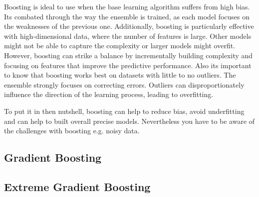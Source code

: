 Boosting is ideal to use when the base learning algorithm suffers from high bias.
Its combated through the way the ensemble is trained, as each model focuses on the
weaknesses of the previous one.
Additionally, boosting is particularly effective with high-dimensional data, where
the number of features is large. Other models might not be able to capture the 
complexity or larger models might overfit. However, boosting can strike a 
balance by incrementally building complexity and focusing on features that improve
the predictive performance.
Also its important to know that boosting works best on datasets with little to no
outliers. The ensemble strongly focuses on correcting errors. Outliers can 
disproportionately influence the direction of the learning process, leading
to overfitting.


To put it in then nutshell, boosting can help to reduce bias, avoid underfitting
and can help to built overall precise models. Nevertheless you have to be aware
of the challenges with boosting e.g. noisy data.


\subsection{Gradient Boosting}

\subsection{Extreme Gradient Boosting}


